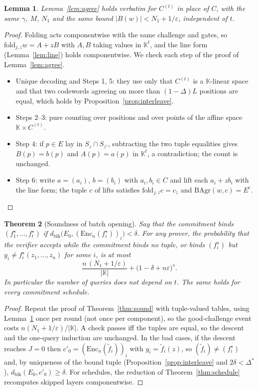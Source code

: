 \documentclass[11pt]{article}
\newtheorem{theorem}{Theorem}[section]
\newtheorem{lemma}[theorem]{Lemma}
\theoremstyle{definition}
\newcommand{\K}{\mathbb{K}}
\newcommand{\Enc}{\mathrm{Enc}}
\newcommand{\fold}{\mathrm{fold}}
\newcommand{\dblk}{d_{\mathrm{blk}}}
\begin{document}
\begin{lemma}\label{lem:agree-batch}
Lemma~\ref{lem:agree} holds verbatim for $C^{(t)}$ in place of $C$, with the same $\gamma$, $M$, $N_1$ and the
same bound $|B(w)|<N_1+1/\varepsilon$, independent of $t$.
\end{lemma}
\begin{proof}
Folding acts componentwise with the same challenge and gates, so $\fold_{j,z}w=A+zB$ with $A,B$ taking
values in $\K^t$, and the line form (Lemma~\ref{lem:line}) holds componentwise. We check each step of the
proof of Lemma~\ref{lem:agree}.
\begin{itemize}[leftmargin=*]
\item Unique decoding and Steps 1, 5: they use only that $C^{(t)}$ is a $\K$-linear space and that two
codewords agreeing on more than $(1-\Delta)L$ positions are equal, which holds by
Proposition~\ref{prop:interleave}.
\item Steps 2--3: pure counting over positions and over points of the affine space $\K\times C^{(t)}$.
\item Step 4: if $p\in E$ lay in $S_z\cap S_{z'}$, subtracting the two tuple equalities gives
$B(p)=b(p)$ and $A(p)=a(p)$ in $\K^t$, a contradiction; the count is unchanged.
\item Step 6: write $a=(a_i)$, $b=(b_i)$ with $a_i,b_i\in C$ and lift each $a_i+zb_i$ with the line form;
the tuple $c$ of lifts satisfies $\fold_{j,z}c=c_z$ and $\mathrm{BAgr}(w,c)=E^{c}$.\qedhere
\end{itemize}
\end{proof}

\begin{theorem}[Soundness of batch opening]\label{thm:batch}
Say that the commitment binds $(f^\star_1,\dots,f^\star_t)$ if
$\dblk\bigl(E_0,(\Enc_n(f^\star_i))_i\bigr)<\delta$. For any prover, the probability that the verifier
accepts while the commitment binds no tuple, or binds $(f_i^\star)$ but $y_i\neq f_i^\star(z_1,\dots,z_n)$ for
some $i$, is at most
\[
\frac{n\,(N_1+1/\varepsilon)}{|\K|}+\bigl(1-\delta+n\varepsilon\bigr)^{s}.
\]
In particular the number of queries does not depend on $t$. The same holds for every commitment schedule.
\end{theorem}
\begin{proof}
Repeat the proof of Theorem~\ref{thm:sound} with tuple-valued tables, using Lemma~\ref{lem:agree-batch}
once per round (not once per component), so the good-challenge event costs $n(N_1+1/\varepsilon)/|\K|$. A
check passes iff the tuples are equal, so the descent and the one-query induction are unchanged. In the
bad cases, if the descent reaches $J=0$ then $c'_0=(\Enc_n(\tilde f_i))_i$ with $y_i=\tilde f_i(z)$, so
$(\tilde f_i)\neq(f_i^\star)$ and, by uniqueness of the bound tuple (Proposition~\ref{prop:interleave} and
$2\delta<\Delta^{*}$), $\dblk(E_0,c'_0)\ge\delta$. For schedules, the reduction of Theorem~\ref{thm:schedule}
recomputes skipped layers componentwise.
\end{proof}
\end{document}
